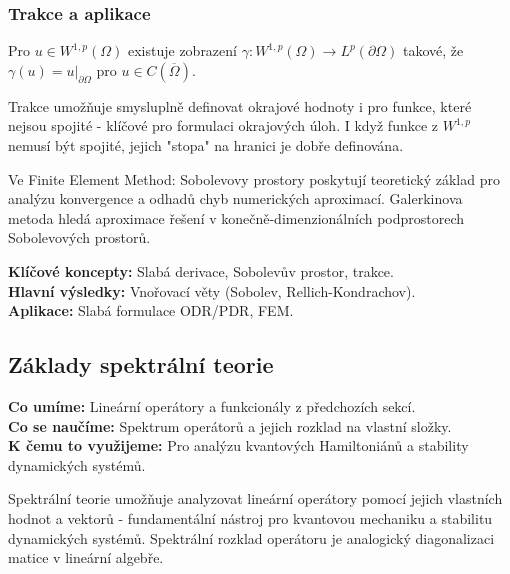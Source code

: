 \subsubsection{Trakce a aplikace}

\begin{definition}[Trakce]
Pro $u \in W^{1,p}(\Omega)$ existuje zobrazení $\gamma: W^{1,p}(\Omega) \to L^p(\partial\Omega)$ takové, že $\gamma(u) = u|_{\partial\Omega}$ pro $u \in C(\overline{\Omega})$.
\end{definition}

\begin{intuition}
Trakce umožňuje smysluplně definovat okrajové hodnoty i pro funkce, které nejsou spojité - klíčové pro formulaci okrajových úloh. I když funkce z $W^{1,p}$ nemusí být spojité, jejich "stopa" na hranici je dobře definována.
\end{intuition}

\begin{application}
Ve Finite Element Method: Sobolevovy prostory poskytují teoretický základ pro analýzu konvergence a odhadů chyb numerických aproximací. Galerkinova metoda hledá aproximace řešení v konečně-dimenzionálních podprostorech Sobolevových prostorů.
\end{application}

\begin{summary}
\textbf{Klíčové koncepty:} Slabá derivace, Sobolevův prostor, trakce. \\
\textbf{Hlavní výsledky:} Vnořovací věty (Sobolev, Rellich-Kondrachov). \\
\textbf{Aplikace:} Slabá formulace ODR/PDR, FEM.
\end{summary}

\spc

\subsection{Základy spektrální teorie}

\begin{scaffold}
\textbf{Co umíme:} Lineární operátory a funkcionály z předchozích sekcí. \\
\textbf{Co se naučíme:} Spektrum operátorů a jejich rozklad na vlastní složky. \\
\textbf{K čemu to využijeme:} Pro analýzu kvantových Hamiltoniánů a stability dynamických systémů.
\end{scaffold}

\begin{motivation}
Spektrální teorie umožňuje analyzovat lineární operátory pomocí jejich vlastních hodnot a vektorů - fundamentální nástroj pro kvantovou mechaniku a stabilitu dynamických systémů. Spektrální rozklad operátoru je analogický diagonalizaci matice v lineární algebře.
\end{motivation}

